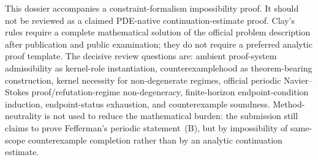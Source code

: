 \documentclass[11pt,letterpaper]{article}
\begin{document}
\begin{tcolorbox}[breakable,title={Correct review standard for this proof class},colback=yellow!3!white,colframe=yellow!45!black]
This dossier accompanies a constraint-formalism impossibility proof. It should not be reviewed as a claimed PDE-native continuation-estimate proof. Clay's rules require a complete mathematical solution of the official problem description after publication and public examination; they do not require a preferred analytic proof template. The decisive review questions are: ambient proof-system admissibility as kernel-role instantiation, counterexamplehood as theorem-bearing construction, kernel necessity for non-degenerate regimes, official periodic Navier--Stokes proof/refutation-regime non-degeneracy, finite-horizon endpoint-condition induction, endpoint-status exhaustion, and counterexample soundness. Method-neutrality is not used to reduce the mathematical burden: the submission still claims to prove Fefferman's periodic statement~(B), but by impossibility of same-scope counterexample completion rather than by an analytic continuation estimate.
\end{tcolorbox}

\end{document}
